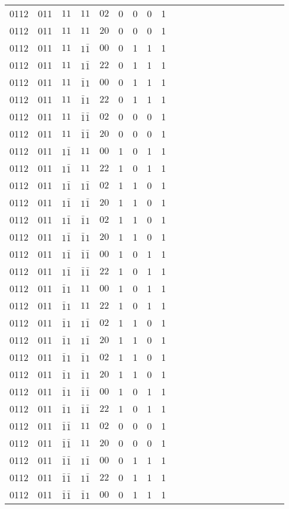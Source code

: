 \begin{longtable*}{c| cccccccccccccccccccc }
0112& 011& $11$& $11$& $02$& 0& 0& 0& 1\\
0112& 011& $11$& $11$& $20$& 0& 0& 0& 1\\
0112& 011& $11$& $1\bar{1}$& $00$& 0& 1& 1& 1\\
0112& 011& $11$& $1\bar{1}$& $22$& 0& 1& 1& 1\\
0112& 011& $11$& $\bar{1}1$& $00$& 0& 1& 1& 1\\
0112& 011& $11$& $\bar{1}1$& $22$& 0& 1& 1& 1\\
0112& 011& $11$& $\bar{1}\bar{1}$& $02$& 0& 0& 0& 1\\
0112& 011& $11$& $\bar{1}\bar{1}$& $20$& 0& 0& 0& 1\\
0112& 011& $1\bar{1}$& $11$& $00$& 1& 0& 1& 1\\
0112& 011& $1\bar{1}$& $11$& $22$& 1& 0& 1& 1\\
0112& 011& $1\bar{1}$& $1\bar{1}$& $02$& 1& 1& 0& 1\\
0112& 011& $1\bar{1}$& $1\bar{1}$& $20$& 1& 1& 0& 1\\
0112& 011& $1\bar{1}$& $\bar{1}1$& $02$& 1& 1& 0& 1\\
0112& 011& $1\bar{1}$& $\bar{1}1$& $20$& 1& 1& 0& 1\\
0112& 011& $1\bar{1}$& $\bar{1}\bar{1}$& $00$& 1& 0& 1& 1\\
0112& 011& $1\bar{1}$& $\bar{1}\bar{1}$& $22$& 1& 0& 1& 1\\
0112& 011& $\bar{1}1$& $11$& $00$& 1& 0& 1& 1\\
0112& 011& $\bar{1}1$& $11$& $22$& 1& 0& 1& 1\\
0112& 011& $\bar{1}1$& $1\bar{1}$& $02$& 1& 1& 0& 1\\
0112& 011& $\bar{1}1$& $1\bar{1}$& $20$& 1& 1& 0& 1\\
0112& 011& $\bar{1}1$& $\bar{1}1$& $02$& 1& 1& 0& 1\\
0112& 011& $\bar{1}1$& $\bar{1}1$& $20$& 1& 1& 0& 1\\
0112& 011& $\bar{1}1$& $\bar{1}\bar{1}$& $00$& 1& 0& 1& 1\\
0112& 011& $\bar{1}1$& $\bar{1}\bar{1}$& $22$& 1& 0& 1& 1\\
0112& 011& $\bar{1}\bar{1}$& $11$& $02$& 0& 0& 0& 1\\
0112& 011& $\bar{1}\bar{1}$& $11$& $20$& 0& 0& 0& 1\\
0112& 011& $\bar{1}\bar{1}$& $1\bar{1}$& $00$& 0& 1& 1& 1\\
0112& 011& $\bar{1}\bar{1}$& $1\bar{1}$& $22$& 0& 1& 1& 1\\
0112& 011& $\bar{1}\bar{1}$& $\bar{1}1$& $00$& 0& 1& 1& 1\\

\end{longtable*}
